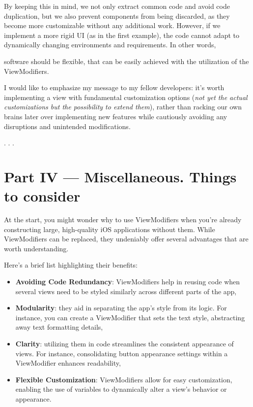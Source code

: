 \documentclass{article}
\newcommand{\separator}{\vspace{5mm}\centerline{. . .}\vspace{5mm}}
\begin{document}
By keeping this in mind, we not only extract common code and avoid code duplication, but we also prevent components from being discarded, as they become more customizable without any additional work. However, if we implement a more rigid UI (as in the first example), the code cannot adapt to dynamically changing environments and requirements. In other words,

\begin{displayquote}
software should be flexible, that can be easily achieved with the utilization of the ViewModifiers.
\end{displayquote}

I would like to emphasize my message to my fellow developers: it’s worth implementing a view with fundamental customization options (\emph{not yet the actual customizations but the possibility to extend them}), rather than racking our own brains later over implementing new features while cautiously avoiding any disruptions and unintended modifications.

\separator

\section{Part IV — Miscellaneous. Things to consider}
\label{sec:part4}

At the start, you might wonder why to use ViewModifiers when you’re already constructing large, high-quality iOS applications without them. While ViewModifiers can be replaced, they undeniably offer several advantages that are worth understanding.

Here’s a brief list highlighting their benefits:

\begin{itemize}
  \item \textbf{Avoiding Code Redundancy}: ViewModifiers help in reusing code when several views need to be styled similarly across different parts of the app,
  \item \textbf{Modularity}: they aid in separating the app’s style from its logic. For instance, you can create a ViewModifier that sets the text style, abstracting away text formatting details,
  \item \textbf{Clarity}: utilizing them in code streamlines the consistent appearance of views. For instance, consolidating button appearance settings within a ViewModifier enhances readability,
  \item \textbf{Flexible Customization}: ViewModifiers allow for easy customization, enabling the use of variables to dynamically alter a view’s behavior or appearance.
\end{itemize}
\end{document}
